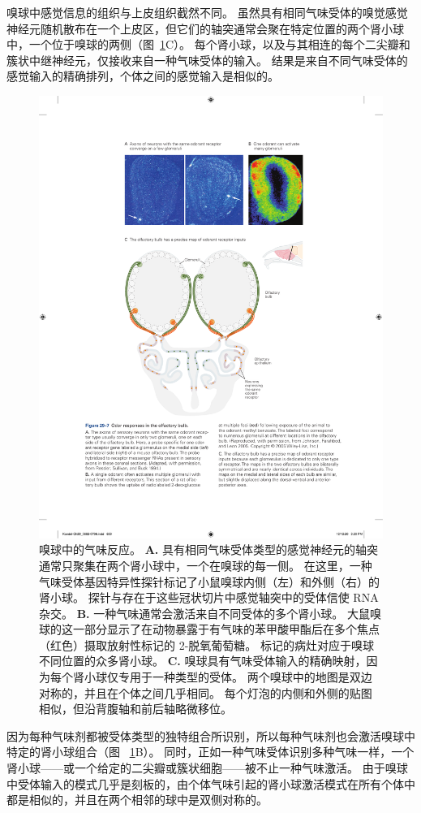嗅球中感觉信息的组织与上皮组织截然不同。
虽然具有相同气味受体的嗅觉感觉神经元随机散布在一个上皮区，但它们的轴突通常会聚在特定位置的两个肾小球中，一个位于嗅球的两侧（图~\ref{fig:29_7}C）。
每个肾小球，以及与其相连的每个二尖瓣和簇状中继神经元，仅接收来自一种气味受体的输入。
结果是来自不同气味受体的感觉输入的精确排列，个体之间的感觉输入是相似的。


\begin{figure}[htbp]
	\centering
	\includegraphics[width=0.7\linewidth]{chap29/fig_29_7}
	\caption{嗅球中的气味反应。
		\textbf{A.} 具有相同气味受体类型的感觉神经元的轴突通常只聚集在两个肾小球中，一个在嗅球的每一侧。
		在这里，一种气味受体基因特异性探针标记了小鼠嗅球内侧（左）和外侧（右）的肾小球。
		探针与存在于这些冠状切片中感觉轴突中的受体信使 RNA 杂交\cite{ressler1994information}。
		\textbf{B.} 一种气味通常会激活来自不同受体的多个肾小球。
		大鼠嗅球的这一部分显示了在动物暴露于有气味的苯甲酸甲酯后在多个焦点（红色）摄取放射性标记的 2-脱氧葡萄糖。
		标记的病灶对应于嗅球不同位置的众多肾小球\cite{johnson2005interactions}。
		\textbf{C.} 嗅球具有气味受体输入的精确映射，因为每个肾小球仅专用于一种类型的受体。
		两个嗅球中的地图是双边对称的，并且在个体之间几乎相同。
		每个灯泡的内侧和外侧的贴图相似，但沿背腹轴和前后轴略微移位。}
	\label{fig:29_7}
\end{figure}


因为每种气味剂都被受体类型的独特组合所识别，所以每种气味剂也会激活嗅球中特定的肾小球组合（图 ~\ref{fig:29_7}B）。
同时，正如一种气味受体识别多种气味一样，一个肾小球——或一个给定的二尖瓣或簇状细胞——被不止一种气味激活。
由于嗅球中受体输入的模式几乎是刻板的，由个体气味引起的肾小球激活模式在所有个体中都是相似的，并且在两个相邻的球中是双侧对称的。


